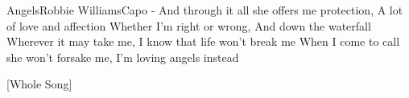 \begin{song}{Angels}{Robbie Williams}{Capo - }
And through it all she offers me protection, A lot of love and affection
Whether I'm right or wrong, And down the waterfall
Wherever it may take me, I know that life won't break me
When I come to call she won't forsake me, I'm loving angels instead





































[Whole Song]
\end{song}